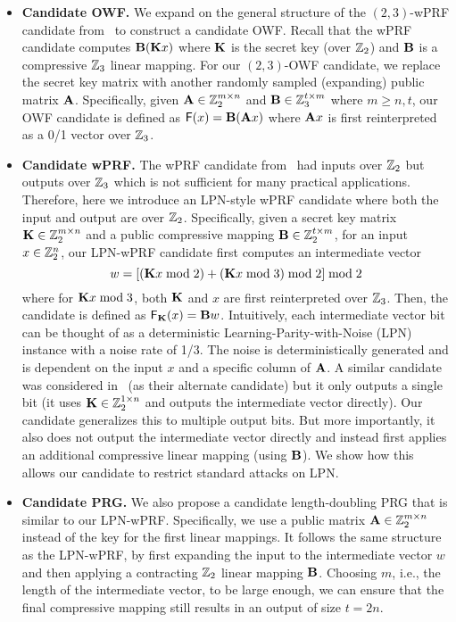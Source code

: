 \begin{itemize}
    \item \textbf{Candidate OWF.} 
    We expand on the general structure of the $(2,3)$-wPRF candidate from~\cite{boneh2018-darkmatter} to construct a candidate OWF. Recall that the wPRF candidate computes $\mat{B}(\mat{K}x)$ where $\mat{K}$ is the secret key (over $\mathbb{Z}_2$) and $\mat{B}$ is a compressive $\mathbb{Z}_3$ linear mapping. For our $(2,3)$-OWF candidate, we replace the secret key matrix with another randomly sampled (expanding) public matrix $\mat{A}$. Specifically, given $\mat{A} \in \Z_2^{m \times n}$ and $\mat{B} \in \Z_3^{t \times m}$ where $m \geq n,t$, our OWF candidate is defined as $\mathsf{F}(x) = \mat{B}(\mat{A}x)$ where $\mat{A}x$ is first reinterpreted as a 0/1 vector over $\mathbb{Z}_3$.

    \item \textbf{Candidate wPRF.}
    The wPRF candidate from~\cite{boneh2018-darkmatter} had inputs over $\mathbb{Z}_2$ but outputs over $\mathbb{Z}_3$ which is not sufficient for many practical applications. Therefore, here we introduce an LPN-style wPRF candidate where both the input and output are over $\mathbb{Z}_2$. Specifically, given a secret key matrix $\mat{K} \in \Z_2^{m \times n}$ and a public compressive mapping $\mat{B} \in \Z_2^{t \times m}$, for an input $x \in \mathbb{Z}_2^n$, our LPN-wPRF candidate first computes an intermediate vector
    \[
        w = [(\mat{K}x \bmod 2) + (\mat{K}x \bmod 3) \bmod 2] \bmod 2
    \]
    where for $\mat{K}x \bmod 3$, both $\mat{K}$ and $x$ are first reinterpreted over $\mathbb{Z}_3$. Then, the candidate is defined as $\mathsf{F}_\mat{K}(x) = \mat{B}w$. Intuitively, each intermediate vector bit can be thought of as a deterministic Learning-Parity-with-Noise (LPN) instance with a noise rate of 1/3. The noise is deterministically generated and is dependent on the input $x$ and a specific column of $\mat{A}$. A similar candidate was considered in~\cite{boneh2018-darkmatter} (as their alternate candidate) but it only outputs a single bit (it uses $\mat{K} \in \Z_2^{1 \times n}$ and outputs the intermediate vector directly). Our candidate generalizes this to multiple output bits. But more importantly, it also does not output the intermediate vector directly and instead first applies an additional compressive linear mapping (using $\mat{B}$). We show how this allows our candidate to restrict standard attacks on LPN.


    \item \textbf{Candidate PRG.}
    We also propose a candidate length-doubling PRG that is similar to our LPN-wPRF. Specifically, we use a public matrix $\mat{A} \in \Z_2^{m \times n}$ instead of the key for the first linear mappings. It follows the same structure as the LPN-wPRF, by first expanding the input to the intermediate vector $w$ and then applying a contracting $\mathbb{Z}_2$ linear mapping $\mat{B}$. Choosing $m$, i.e., the length of the intermediate vector, to be large enough, we can ensure that the final compressive mapping still results in an output of size $t = 2n$.


\end{itemize}
